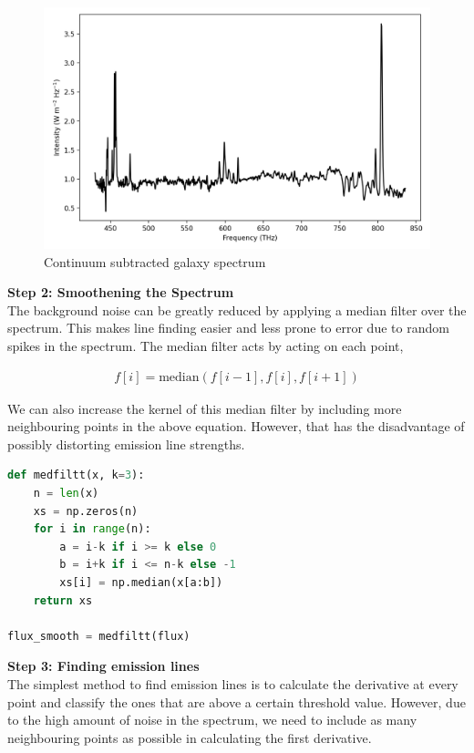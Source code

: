 \begin{figure}[H]
    \centering
    \includegraphics[width=0.7\linewidth]{Figures/3/continuum_sub.png}
    \caption{Continuum subtracted galaxy spectrum}
\end{figure}

\noindent \textbf{Step 2: Smoothening the Spectrum}\\
\noindent The background noise can be greatly reduced by applying a median filter over the spectrum. This makes line finding easier and less prone to error due to random spikes in
the spectrum. The median filter acts by acting on each point,

\begin{align}
    f[i] = \text{median}(f[i-1], f[i], f[i+1])
\end{align}

We can also increase the kernel of this median filter by including more neighbouring points in the above equation. However, that has the disadvantage of possibly distorting emission line strengths.

\begin{lstlisting}[language=Python, caption=Implementation of median filter with kernel k = 3 (i.e. median along two neighbouring points)]
def medfiltt(x, k=3):
    n = len(x)
    xs = np.zeros(n)
    for i in range(n):
        a = i-k if i >= k else 0
        b = i+k if i <= n-k else -1 
        xs[i] = np.median(x[a:b])
    return xs

flux_smooth = medfiltt(flux)
\end{lstlisting}

\noindent \textbf{Step 3: Finding emission lines}\\
\noindent The simplest method to find emission lines is to calculate the derivative at every point and classify the ones that are above a certain threshold value. However, due to the high amount of noise in the spectrum, we need to include as many neighbouring points as possible in calculating the first derivative.

